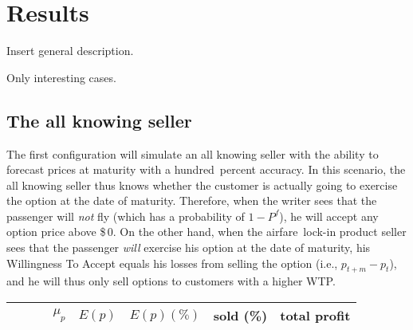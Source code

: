 \chapter{Results}
Insert general description.

Only interesting cases.

\section{The all knowing seller}
The first configuration will simulate an all knowing seller with the ability to forecast prices at maturity with a hundred~percent accuracy. In this scenario, the all knowing seller thus knows whether the customer is actually going to exercise the option at the date of maturity. Therefore, when the writer sees that the passenger will \emph{not} fly (which has a probability of $1-P^f$), he will accept any option price above \$\,0. On the other hand, when the airfare~lock-in product seller sees that the passenger \emph{will} exercise his option at the date of maturity, his Willingness To Accept equals his losses from selling the option (i.e., $p_{t+m} - p_t$), and he will thus only sell options to customers with a higher WTP. 


\begin{center}
\begin{longtable}{l l r r r r r}
    \toprule
    ~ & ~ &  $\mu_p$  & $E(p)$  & $E(p) (\%)$  &  sold (\%)  &  total profit  \\
    \midrule

    \bottomrule
\end{longtable}
\end{center}

